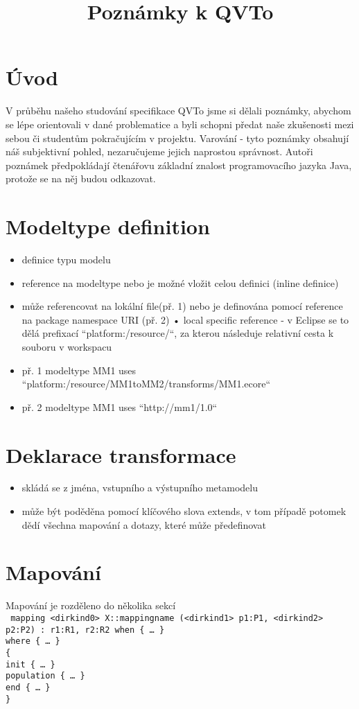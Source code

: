 \documentclass[11pt,a4paper]{article}   	%
\begin{document}
\title{Poznámky k QVTo}
\section{Úvod}
V průběhu našeho studování specifikace QVTo jsme si dělali poznámky, abychom se
lépe orientovali v dané problematice a byli schopni předat naše zkušenosti mezi
sebou či studentům pokračujícím v projektu. Varování - tyto poznámky obsahují
náš subjektivní pohled, nezaručujeme jejich naprostou správnost. Autoři poznámek
předpokládají čtenářovu základní znalost programovacího jazyka Java, protože se
na něj budou odkazovat.


\section {Modeltype definition}
\begin {itemize}
  	\item	definice typu modelu  
  	\item 	reference na modeltype nebo je možné vložit celou definici
			(inline definice)
	\item	může referencovat na lokální file(př. 1) nebo je definována pomocí
			reference na package namespace URI (př. 2) • local specific reference - v
			Eclipse se to dělá prefixací “platform:/resource/“, za kterou následuje
			relativní cesta k souboru v workspacu
	\item 	př. 1 modeltype MM1 uses
			“platform:/resource/MM1toMM2/transforms/MM1.ecore“
	\item	př. 2 modeltype MM1 uses “http://mm1/1.0“
\end{itemize} 

\section {Deklarace transformace}
\begin{itemize}
  \item 	skládá se z jména, vstupního a výstupního metamodelu
  \item 	může být poděděna pomocí klíčového slova extends, v tom případě potomek
  dědí všechna mapování a dotazy, které může předefinovat
\end{itemize}


\section{Mapování}
Mapování je rozděleno do několika sekcí \\
\texttt{
	mapping <dirkind0> X::mappingname
		(<dirkind1> p1:P1, <dirkind2> p2:P2) : r1:R1, r2:R2
		when \{ … \}\\
		where \{ … \}\\
	\{\\
		init \{ … \}\\
		population \{ … \}\\
		end \{ … \}\\
	\}
}
\end{document}
